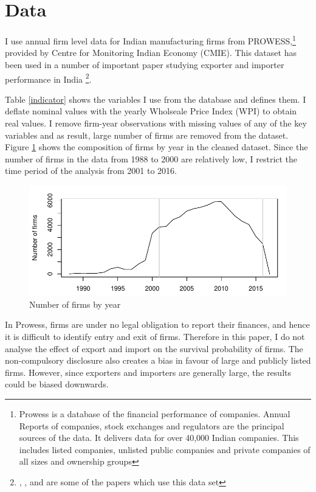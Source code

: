 \documentclass[12pt]{article}
\begin{document}
\section{Data}\label{sec:data}
I use annual firm level data for Indian manufacturing firms from
PROWESS,\footnote{Prowess is a database of the financial performance of
  companies. Annual Reports of companies, stock exchanges and
  regulators are the principal sources of the data. It delivers data for over 40,000 Indian companies. This includes listed companies, unlisted public companies and private companies of all sizes and ownership groups} provided by Centre for Monitoring Indian Economy
(CMIE). This dataset has been used in a number of important paper
studying exporter and importer performance in India \footnote{
  \textcite{de2016prices}, \textcite{topalova2011trade}, \textcite{gupta2018exporting} and  \textcite{haidar2012trade} are
  some of the papers which use this data set}.
\begin{center}

\end{center}
Table \ref{indicator}
shows the variables I use from the database and defines them.
I deflate nominal values with the yearly Wholseale Price
Index (WPI) to obtain real values. I remove firm-year observations
with missing values of any of the key variables and as result, large number of
firms are removed from the dataset. Figure \ref{compnfirms}  shows the composition of
firms by year in the cleaned dataset. Since the number of firms in the
data from 1988 to 2000 are relatively low, I restrict the time period of the analysis from 2001 to 2016.  
\begin{center}
\begin{figure}
\includegraphics{./TABLES/compnfirms.pdf}
\caption{Number of firms by year}
\label{compnfirms}
\end{figure}
\end{center}
 In Prowess, firms
are under no legal obligation to report their finances, and hence it
is difficult to identify entry and exit of firms. Therefore in this
paper, I do not analyse the effect of export and import on
the survival probability of firms. The non-compulsory disclosure also
creates a bias in favour of large and publicly listed firms. However,
since exporters and importers are generally large, the results could
be biased downwards. 
\end{document}
